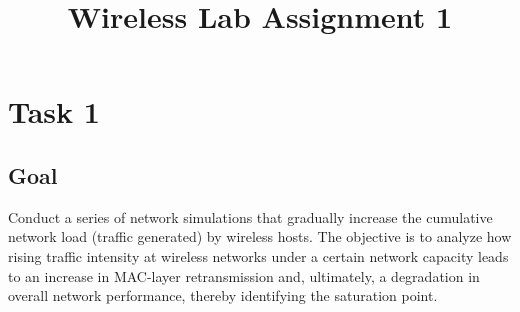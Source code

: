 \documentclass{rapport}
\title{Wireless Lab Assignment 1} %
\begin{document}

\subject{CSE 4616} %



        
\buildmargins %
\buildcover %
\toc %


\section{Task 1}
\subsection{Goal}
Conduct a series of network simulations that gradually increase the cumulative network load (traffic
generated) by wireless hosts. The objective is to analyze how rising traffic intensity at wireless networks under a certain network capacity leads to an increase in MAC-layer retransmission and, ultimately, a degradation in overall network performance, thereby identifying the saturation point.
\end{document}
